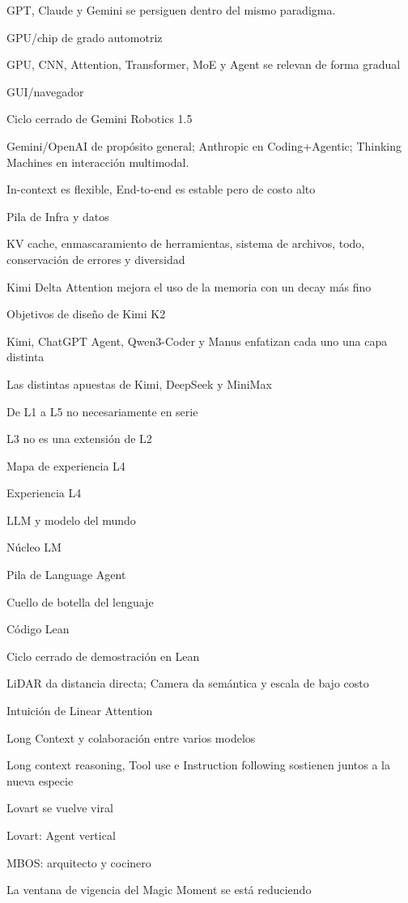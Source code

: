 \documentclass{article}
\begin{document}
GPT, Claude y Gemini se persiguen dentro del mismo paradigma.

GPU/chip de grado automotriz

GPU, CNN, Attention, Transformer, MoE y Agent se relevan de forma gradual

GUI/navegador

Ciclo cerrado de Gemini Robotics 1.5

Gemini/OpenAI de propósito general; Anthropic en Coding+Agentic; Thinking Machines en interacción multimodal.

In-context es flexible, End-to-end es estable pero de costo alto

Pila de Infra y datos

KV cache, enmascaramiento de herramientas, sistema de archivos, todo, conservación de errores y diversidad

Kimi Delta Attention mejora el uso de la memoria con un decay más fino

Objetivos de diseño de Kimi K2

Kimi, ChatGPT Agent, Qwen3-Coder y Manus enfatizan cada uno una capa distinta

Las distintas apuestas de Kimi, DeepSeek y MiniMax

De L1 a L5 no necesariamente en serie

L3 no es una extensión de L2

Mapa de experiencia L4

Experiencia L4

LLM y modelo del mundo

Núcleo LM

Pila de Language Agent

Cuello de botella del lenguaje

Código Lean

Ciclo cerrado de demostración en Lean

LiDAR da distancia directa; Camera da semántica y escala de bajo costo

Intuición de Linear Attention

Long Context y colaboración entre varios modelos

Long context reasoning, Tool use e Instruction following sostienen juntos a la nueva especie

Lovart se vuelve viral

Lovart: Agent vertical

MBOS: arquitecto y cocinero

La ventana de vigencia del Magic Moment se está reduciendo
\end{document}
